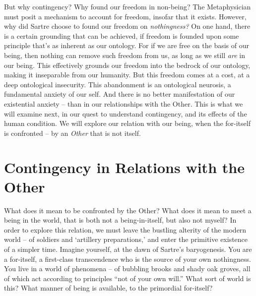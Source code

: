 

But why contingency? Why found our freedom in non-being? The Metaphysician must posit a mechanism to account for freedom, insofar that it exists. However, why did Sartre choose to found our freedom on \emph{nothingness?} On one hand, there is a certain grounding that can be achieved, if freedom is founded upon some principle that's as inherent as our ontology. For if we are free on the basis of our being, then nothing can remove such freedom from us, as long as we still \emph{are} in our being.  This effectively grounds our freedom into the bedrock of our ontology, making it inseparable from our humanity. But this freedom comes at a cost, at a deep ontological insecurity.  This abandonment is an ontological neurosis, a fundamental anxiety of our self. And there is no better manifestation of our existential anxiety -- than in our relationships with the Other. This is what we will examine next, in our quest to understand contingency, and its effects of the human condition. We will explore our relation with our being, when the for-itself is confronted -- by an \emph{Other} that is not itself.

\section{Contingency in Relations with the Other}

What does it mean to be confronted by the Other? What does it mean to meet a being in the world, that is both not a being-in-itself, but also not myself? In order to explore this relation, we must leave the bustling alterity of the modern world -- of soldiers and \enquote*{artillery preparations,} and enter the primitive existence of a simpler time. Imagine yourself, at the dawn of Sartre's baryogenesis. You are a for-itself, a first-class transcendence who is the source of your own nothingness. You live in a world of phenomena -- of bubbling brooks and shady oak groves, all of which act according to principles \enquote{not of your own will.} What sort of world is this? What manner of being is available, to the primordial for-itself?

